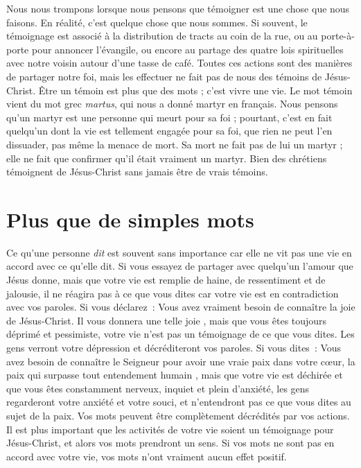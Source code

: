 Nous nous trompons lorsque nous pensons que témoigner
 est une chose que nous faisons.
 En réalité, c'est quelque chose que nous sommes.
 Si souvent, le témoignage est associé à la distribution de tracts
 au coin de la rue, ou au porte-à-porte pour annoncer l'évangile,
 ou encore au partage des quatre lois spirituelles avec notre voisin
 autour d'une tasse de café.
 Toutes ces actions sont des manières de partager notre foi,
 mais les effectuer ne fait pas de nous des témoins de Jésus-Christ.
 Être un témoin est plus que des mots ; c'est vivre une vie.
 Le mot \og témoin \fg{} vient du mot grec \emph{martus},
 qui nous a donné martyr en français.
 Nous pensons qu'un martyr est une personne qui meurt pour sa foi ;
 pourtant, c'est en fait quelqu'un dont la vie est tellement engagée
 pour sa foi, que rien ne peut l'en dissuader, pas même la menace de mort.
 Sa mort ne fait pas de lui un martyr ; elle ne fait que confirmer
 qu'il était vraiment un martyr.
 Bien des chrétiens témoignent de Jésus-Christ
 sans jamais être de vrais témoins.

\section*{Plus que de simples mots}

Ce qu'une personne \emph{dit} est souvent sans importance
 car elle ne vit pas une vie en accord avec ce qu'elle dit.
 Si vous essayez de partager avec quelqu'un l'amour que Jésus donne,
 mais que votre vie est remplie de haine, de ressentiment et de jalousie,
 il ne réagira pas à ce que vous dites car votre vie est en contradiction
 avec vos paroles. Si vous déclarez~:
 \og Vous avez vraiment besoin de connaître la joie de Jésus-Christ.
 Il vous donnera une telle joie \fg{}, mais que vous êtes toujours déprimé
 et pessimiste, votre vie n'est pas un témoignage de ce que vous dites.
 Les gens verront votre dépression et décréditeront vos paroles.
 Si vous dites~: \og Vous avez besoin de connaître le Seigneur pour avoir
 une vraie paix dans votre cœur, la paix qui surpasse
 tout entendement humain \fg{}, mais que votre vie est déchirée
 et que vous êtes constamment nerveux, inquiet et plein d'anxiété,
 les gens regarderont votre anxiété et votre souci,
 et n'entendront pas ce que vous dites au sujet de la paix.
 Vos mots peuvent être complètement décrédités par vos actions.
 Il est plus important que les activités de votre vie soient
 un témoignage pour Jésus-Christ, et alors vos mots prendront un sens.
 Si vos mots ne sont pas en accord avec votre vie,
 vos mots n'ont vraiment aucun effet positif.

